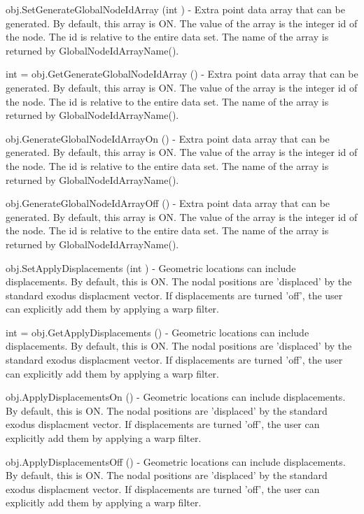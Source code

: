 \begin{DoxyItemize}
\item {\ttfamily obj.\-Set\-Generate\-Global\-Node\-Id\-Array (int )} -\/ Extra point data array that can be generated. By default, this array is O\-N. The value of the array is the integer id of the node. The id is relative to the entire data set. The name of the array is returned by Global\-Node\-Id\-Array\-Name().  
\item {\ttfamily int = obj.\-Get\-Generate\-Global\-Node\-Id\-Array ()} -\/ Extra point data array that can be generated. By default, this array is O\-N. The value of the array is the integer id of the node. The id is relative to the entire data set. The name of the array is returned by Global\-Node\-Id\-Array\-Name().  
\item {\ttfamily obj.\-Generate\-Global\-Node\-Id\-Array\-On ()} -\/ Extra point data array that can be generated. By default, this array is O\-N. The value of the array is the integer id of the node. The id is relative to the entire data set. The name of the array is returned by Global\-Node\-Id\-Array\-Name().  
\item {\ttfamily obj.\-Generate\-Global\-Node\-Id\-Array\-Off ()} -\/ Extra point data array that can be generated. By default, this array is O\-N. The value of the array is the integer id of the node. The id is relative to the entire data set. The name of the array is returned by Global\-Node\-Id\-Array\-Name().  
\item {\ttfamily obj.\-Set\-Apply\-Displacements (int )} -\/ Geometric locations can include displacements. By default, this is O\-N. The nodal positions are 'displaced' by the standard exodus displacment vector. If displacements are turned 'off', the user can explicitly add them by applying a warp filter.  
\item {\ttfamily int = obj.\-Get\-Apply\-Displacements ()} -\/ Geometric locations can include displacements. By default, this is O\-N. The nodal positions are 'displaced' by the standard exodus displacment vector. If displacements are turned 'off', the user can explicitly add them by applying a warp filter.  
\item {\ttfamily obj.\-Apply\-Displacements\-On ()} -\/ Geometric locations can include displacements. By default, this is O\-N. The nodal positions are 'displaced' by the standard exodus displacment vector. If displacements are turned 'off', the user can explicitly add them by applying a warp filter.  
\item {\ttfamily obj.\-Apply\-Displacements\-Off ()} -\/ Geometric locations can include displacements. By default, this is O\-N. The nodal positions are 'displaced' by the standard exodus displacment vector. If displacements are turned 'off', the user can explicitly add them by applying a warp filter.  

\end{DoxyItemize}
